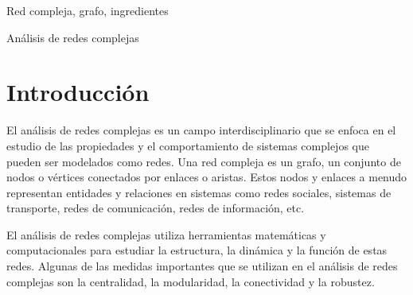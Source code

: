 \documentclass[a4paper]{article}
\begin{document}
\begin{keywords}
	Red compleja, grafo, ingredientes
\end{keywords}

\begin{topics}
	Análisis de redes complejas
\end{topics}


\vspace{0.8cm}



\section{Introducción}\label{sec:intro}

El análisis de redes complejas es un campo interdisciplinario que se enfoca en
el estudio de las propiedades y el comportamiento de sistemas complejos que
pueden ser modelados como redes. Una red compleja es un grafo, un conjunto de
nodos o vértices conectados por enlaces o aristas. Estos nodos y enlaces a
menudo representan entidades y relaciones en sistemas como redes sociales,
sistemas de transporte, redes de comunicación, redes de información, etc.
\cite{boccaletti}

El análisis de redes complejas utiliza herramientas matemáticas y
computacionales para estudiar la estructura, la dinámica y la función de estas
redes. Algunas de las medidas importantes que se utilizan en el análisis de
redes complejas son la centralidad, la modularidad, la conectividad y la
robustez.\cite{costa}
\end{document}
